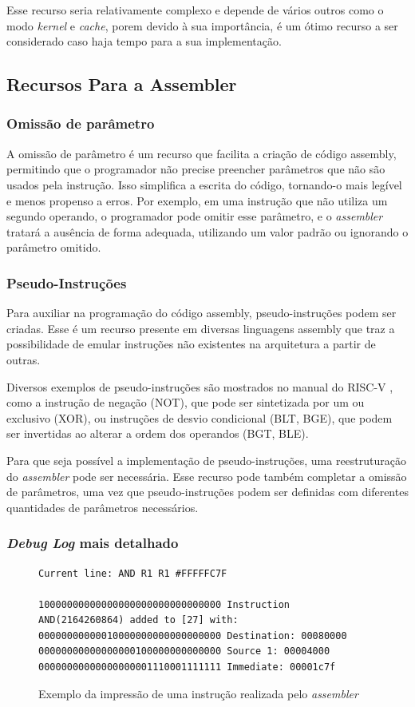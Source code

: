 \documentclass[
	12pt,				%
	openright,			%
	oneside,			%
	a4paper,			%
	english,			%
	french,				%
	spanish,			%
	brazil,				%
	]{abntex2}
\begin{document}
Esse recurso seria relativamente complexo e depende de vários outros como o modo \textit{kernel} e \textit{cache}, porem devido à sua importância, é um ótimo recurso a ser considerado caso haja tempo para a sua implementação.

\subsection{Recursos Para a Assembler}
\subsubsection{Omissão de parâmetro}\label{recursos_omissao}
A omissão de parâmetro é um recurso que facilita a criação de código assembly, permitindo que o programador não precise preencher parâmetros que não são usados pela instrução. Isso simplifica a escrita do código, tornando-o mais legível e menos propenso a erros. Por exemplo, em uma instrução que não utiliza um segundo operando, o programador pode omitir esse parâmetro, e o \textit{assembler} tratará a ausência de forma adequada, utilizando um valor padrão ou ignorando o parâmetro omitido.

\subsubsection{Pseudo-Instruções}\label{recursos_pseudo_inst}%
Para auxiliar na programação do código assembly, pseudo-instruções podem ser criadas. Esse é um recurso presente em diversas linguagens assembly que traz a possibilidade de emular instruções não existentes na arquitetura a partir de outras.

Diversos exemplos de pseudo-instruções são mostrados no manual do RISC-V \cite{risc-v_risc-v_2024}, como a instrução de negação (NOT), que pode ser sintetizada por um ou exclusivo (XOR), ou instruções de desvio condicional (BLT, BGE), que podem ser invertidas ao alterar a ordem dos operandos (BGT, BLE).

Para que seja possível a implementação de pseudo-instruções, uma reestruturação do \textit{assembler} pode ser necessária. Esse recurso pode também completar a omissão de parâmetros, uma vez que pseudo-instruções podem ser definidas com diferentes quantidades de parâmetros necessários.

\subsubsection{\textit{Debug Log} mais detalhado}\label{recursos_debug_log}
\begin{figure}[h]
\centering
\begin{lstlisting}
Current line: AND R1 R1 #FFFFFC7F

10000000000000000000000000000000 Instruction AND(2164260864) added to [27] with:
00000000000010000000000000000000 Destination: 00080000
00000000000000000100000000000000 Source 1: 00004000
00000000000000000001110001111111 Immediate: 00001c7f
\end{lstlisting}
\caption{Exemplo da impressão de uma instrução realizada pelo \textit{assembler}}
\label{fig:assemblerRuim}
\end{figure}
\end{document}
